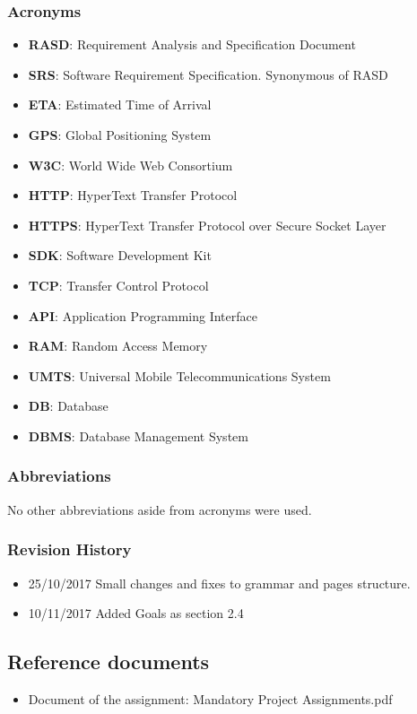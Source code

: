 \subsubsection{Acronyms}
\begin{itemize}
\item \textbf{RASD}: Requirement Analysis and Specification Document
\item \textbf{SRS}: Software Requirement Specification. Synonymous of RASD
\item \textbf{ETA}: Estimated Time of Arrival
\item \textbf{GPS}: Global Positioning System
\item \textbf{W3C}: World Wide Web Consortium
\item \textbf{HTTP}: HyperText Transfer Protocol 
\item \textbf{HTTPS}: HyperText Transfer Protocol over Secure Socket Layer 
\item \textbf{SDK}: Software Development Kit
\item \textbf{TCP}: Transfer Control Protocol
\item \textbf{API}: Application Programming Interface
\item \textbf{RAM}: Random Access Memory
\item \textbf{UMTS}: Universal Mobile Telecommunications System
\item \textbf{DB}: Database
\item \textbf{DBMS}: Database Management System
\end{itemize}
\subsubsection{Abbreviations}
No other abbreviations aside from acronyms were used.
\subsubsection{Revision History}
\begin{itemize}
\item 25/10/2017 Small changes and fixes to grammar and pages structure.
\item 10/11/2017 Added Goals as section 2.4
\end{itemize}
\subsection{Reference documents}
\begin{itemize}
\item Document of the assignment: Mandatory Project Assignments.pdf
\end{itemize}